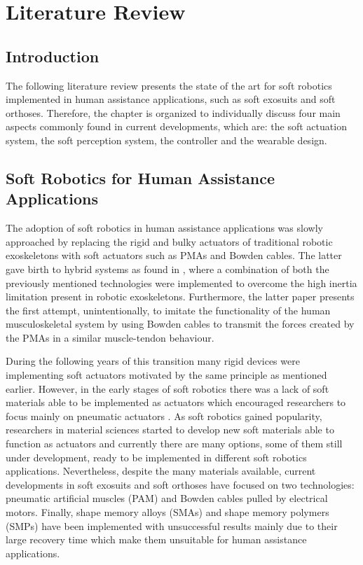\chapter{Literature Review}

\section{Introduction}
The following literature review presents the state of the art for soft robotics implemented in human assistance applications, such as soft exosuits and soft orthoses. Therefore, the chapter is organized to individually discuss four main aspects commonly found in current developments, which are: the soft actuation system, the soft perception system, the controller and the wearable design.

\section{Soft Robotics for Human Assistance Applications}

The adoption of soft robotics in human assistance applications was slowly approached by replacing the rigid and bulky actuators of traditional robotic exoskeletons with soft actuators such as PMAs and Bowden cables. The latter gave birth to hybrid systems as found in \cite{Noda2014}, where a combination of both the previously mentioned technologies were implemented to overcome the high inertia limitation present in robotic exoskeletons. Furthermore, the latter paper presents the first attempt, unintentionally, to imitate the functionality of the human musculoskeletal system by using Bowden cables to transmit the forces created by the PMAs in a similar muscle-tendon behaviour. 

During the following years of this transition many rigid devices were implementing soft actuators motivated by the same principle as mentioned earlier. However, in the early stages of soft robotics there was a lack of soft materials able to be implemented as actuators which encouraged researchers to focus mainly on pneumatic actuators \cite{Belforte2014}. As soft robotics gained popularity, researchers in material sciences started to develop new soft materials able to function as actuators and currently there are many options, some of them still under development, ready to be implemented in different soft robotics applications. Nevertheless, despite the many materials available, current developments in soft exosuits and soft orthoses have focused on two technologies: pneumatic artificial muscles (PAM) and Bowden cables pulled by electrical motors. Finally, shape memory alloys (SMAs) and shape memory polymers (SMPs) have been implemented with unsuccessful results mainly due to their large recovery time which make them unsuitable for human assistance applications. 

